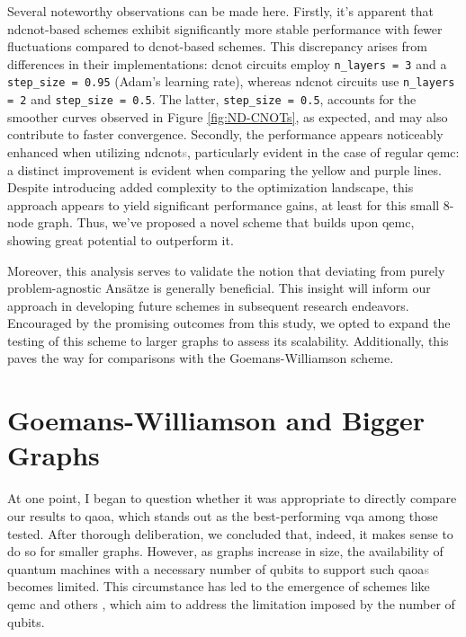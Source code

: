Several noteworthy observations can be made here. Firstly, it's apparent that \acrshort{ndcnot}-based schemes exhibit significantly more stable performance with fewer fluctuations compared to \acrshort{dcnot}-based schemes. This discrepancy arises from differences in their implementations: \acrshort{dcnot} circuits employ \texttt{n\_layers = 3} and a \texttt{step\_size = 0.95} (Adam's learning rate), whereas \acrshort{ndcnot} circuits use \texttt{n\_layers = 2} and \texttt{step\_size = 0.5}. The latter, \texttt{step\_size = 0.5}, accounts for the smoother curves observed in Figure \ref{fig:ND-CNOTs}, as expected, and may also contribute to faster convergence. Secondly, the performance appears noticeably enhanced when utilizing \acrshort{ndcnot}\textcolor{gray}{s}, particularly evident in the case of regular \acrshort{qemc}: a distinct improvement is evident when comparing the yellow and purple lines. Despite introducing added complexity to the optimization landscape, this approach appears to yield significant performance gains, at least for this small $8$-node graph. Thus, we've proposed a novel scheme that builds upon \acrshort{qemc}, showing great potential to outperform it.

Moreover, this analysis serves to validate the notion that deviating from purely problem-agnostic Ansätze is generally beneficial. This insight will inform our approach in developing future schemes in subsequent research endeavors. Encouraged by the promising outcomes from this study, we opted to expand the testing of this scheme to larger graphs to assess its scalability. Additionally, this paves the way for comparisons with the Goemans-Williamson scheme.





\section{Goemans-Williamson and Bigger Graphs}
\label{section:GW_Bigger_Graphs}

At one point, I began to question whether it was appropriate to directly compare our results to \acrshort{qaoa}, which stands out as the best-performing \acrshort{vqa} among those tested. After thorough deliberation, we concluded that, indeed, it makes sense to do so for smaller graphs. However, as graphs increase in size, the availability of quantum machines with a necessary number of qubits to support such \acrshort{qaoa}\textcolor{gray}{s} becomes limited. This circumstance has led to the emergence of schemes like \acrshort{qemc} \cite{tenecohen2023variational} and others \cite{sciorilli2024largescale}, which aim to address the limitation imposed by the number of qubits.

